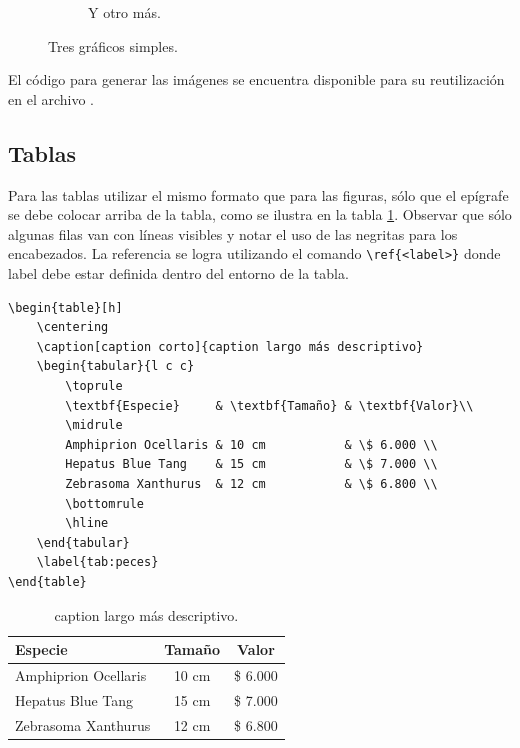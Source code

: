 \begin{figure}[!htpb]
\begin{subfigure}[b]{0.3\textwidth}
         \caption{Y otro más.}
         \label{fig:3de3}
     \end{subfigure}
        \caption{Tres gráficos simples.}
        \label{fig:three graphs}
\end{figure}

El código para generar las imágenes se encuentra disponible para su reutilización en el archivo .

\subsection{Tablas}

Para las tablas utilizar el mismo formato que para las figuras, sólo que el epígrafe se debe colocar arriba de la tabla, como se ilustra en la tabla \ref{tab:peces}. Observar que sólo algunas filas van con líneas visibles y notar el uso de las negritas para los encabezados.  La referencia se logra utilizando el comando \verb|\ref{<label>}| donde label debe estar definida dentro del entorno de la tabla.

\begin{verbatim}
\begin{table}[h]
	\centering
	\caption[caption corto]{caption largo más descriptivo}
	\begin{tabular}{l c c}    
		\toprule
		\textbf{Especie}     & \textbf{Tamaño} & \textbf{Valor}\\
		\midrule
		Amphiprion Ocellaris & 10 cm           & \$ 6.000 \\		
		Hepatus Blue Tang    & 15 cm           & \$ 7.000 \\
		Zebrasoma Xanthurus  & 12 cm           & \$ 6.800 \\
		\bottomrule
		\hline
	\end{tabular}
	\label{tab:peces}
\end{table}
\end{verbatim}


\begin{table}[h]
	\centering
	\caption[caption corto]{caption largo más descriptivo.}
	\begin{tabular}{l c c}    
		\toprule
		\textbf{Especie} 	 & \textbf{Tamaño} 		& \textbf{Valor}  \\
		\midrule
		Amphiprion Ocellaris & 10 cm 				& \$ 6.000 \\		
		Hepatus Blue Tang	 & 15 cm				& \$ 7.000 \\
		Zebrasoma Xanthurus	 & 12 cm				& \$ 6.800 \\
		\bottomrule
		\hline
	\end{tabular}
	\label{tab:peces}
\end{table}

